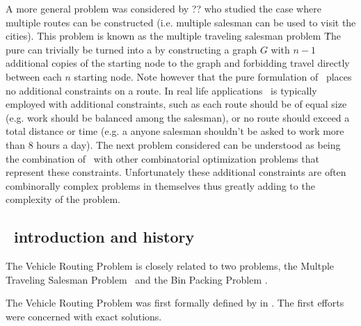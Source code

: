 


A more general problem was considered by ?? who studied the case where multiple routes can be constructed (i.e. multiple salesman can be used to visit the cities). This problem is known as the multiple traveling salesman problem \MTSP\. The pure \MTSP can trivially be turned into a \TSP by constructing a graph $G$ with $n - 1$ additional copies of the starting node to the graph and forbidding travel directly between each $n$ starting node. Note however that the pure formulation of \MTSP\ places no additional constraints on a route. In real life applications \MTSP\ is typically employed with additional constraints, such as each route should be of equal size (e.g. work should be balanced among the salesman), or no route should exceed a total distance or time (e.g. a anyone salesman shouldn't be asked to work more than 8 hours a day). The next problem considered can be understood as being the combination of \MTSP\ with other combinatorial optimization problems that represent these constraints. Unfortunately these additional constraints are often combinorally complex problems in themselves thus greatly adding to the complexity of the problem.    


\subsection{\VRP\ introduction and history}
The Vehicle Routing Problem is closely related to two problems, the Multple Traveling Salesman Problem \MTSP\ and the Bin Packing Problem \BPP. 

The Vehicle Routing Problem was first formally defined by in \cite{Dantzig:1959}. The first efforts were concerned with exact solutions.

\subsection{\VRPTW}

\subsection{\PDPTW}


